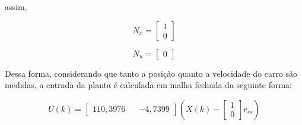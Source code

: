 \noindent assim, 

\begin{equation}
    N_x = 
    \begin{bmatrix} 
        1 \\ 0 
    \end{bmatrix}
    \label{Nx}
\end{equation}

\begin{equation}
    N_u = 
    \begin{bmatrix} 
        0 
    \end{bmatrix}
    \label{Nu}
\end{equation}

Dessa forma, considerando que tanto a posição quanto a velocidade do carro são medidas, a entrada da planta é calculada em malha fechada da seguinte forma:

\begin{equation}
    U(k) = 
    \begin{bmatrix}
        110,3976 && -4,7399
    \end{bmatrix}
    \left(X(k) - 
    \begin{bmatrix}
        1 \\ 0 
    \end{bmatrix}
    r_{ss} \right)
    \label{vetor_controle_realimentacao_calculado}
\end{equation}